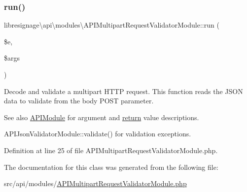 \subsubsection{\texorpdfstring{run()}{run()}}
{\footnotesize\ttfamily libresignage\textbackslash{}api\textbackslash{}modules\textbackslash{}\+A\+P\+I\+Multipart\+Request\+Validator\+Module\+::run (\begin{DoxyParamCaption}\item[{\hyperlink{classlibresignage_1_1api_1_1APIEndpoint}{A\+P\+I\+Endpoint}}]{\$e,  }\item[{array}]{\$args }\end{DoxyParamCaption})}

Decode and validate a multipart H\+T\+TP request. This function reads the J\+S\+ON data to validate from the \textquotesingle{}body\textquotesingle{} P\+O\+ST parameter.

\begin{DoxySeeAlso}{See also}
\hyperlink{classlibresignage_1_1api_1_1APIModule}{A\+P\+I\+Module} for argument and \hyperlink{quota_200-default_8php_ae057f510746f2e7dcbd7d8ccfaf92a45}{return} value descriptions. 

A\+P\+I\+Json\+Validator\+Module\+::validate() for validation exceptions. 
\end{DoxySeeAlso}


Definition at line 25 of file A\+P\+I\+Multipart\+Request\+Validator\+Module.\+php.



The documentation for this class was generated from the following file\+:\begin{DoxyCompactItemize}
\item 
src/api/modules/\hyperlink{APIMultipartRequestValidatorModule_8php}{A\+P\+I\+Multipart\+Request\+Validator\+Module.\+php}\end{DoxyCompactItemize}
